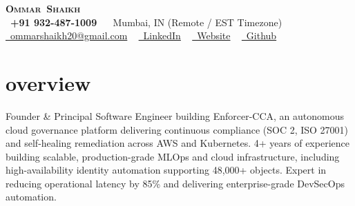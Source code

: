 \documentclass[11pt,letterpaper]{article}
\makeatletter
\newcommand{\firstname}{Ommar}
\newcommand{\lastname}{Shaikh}
\newcommand{\email}{ommarshaikh20@gmail.com}
\newcommand{\linkedin}{https://www.linkedin.com/in/ommar-shaikh-02b3a1207/}
\newcommand{\github}{https://github.com/OmmarShaikh01}
\newcommand{\website}{https://ommarshaikh01.github.io/}
\newcommand{\jasphone}{+91 932-487-1009}
\newcommand{\location}{Mumbai, IN (Remote / EST Timezone)}
\newcommand{\resumeoverview}{Founder \& Principal Software Engineer building Enforcer-CCA, an autonomous cloud governance platform delivering continuous compliance (SOC 2, ISO 27001) and self-healing remediation across AWS and Kubernetes. 4+ years of experience building scalable, production-grade MLOps and cloud infrastructure, including high-availability identity automation supporting 48,000+ objects. Expert in reducing operational latency by 85\% and delivering enterprise-grade DevSecOps automation.}
\makeatother
\begin{document}
    \AddToShipoutPicture*{%
        \color{grey}
        \AtPageUpperLeft{\rule[-3cm]{\paperwidth}{5cm}}
    }
    \begin{center}
        {\Huge \scshape \textbf{\firstname \ \lastname}} \\ \vspace{1pt}
        \vspace{2pt}
        \raisebox{-0.2\height}\textbullet \ \textbf{\jasphone} ~
        \raisebox{-0.2\height}\textbullet \ \location
        \vspace{2pt} \\
        \href{mailto:\email}{\raisebox{-0.2\height}\textbullet \ \email} ~
        \href{\linkedin}{\raisebox{-0.2\height}\textbullet \ LinkedIn} ~
        \href{\website}{\raisebox{-0.2\height}\textbullet \ Website} ~
        \href{\github}{\raisebox{-0.2\height}\textbullet \ Github} \\
        \vspace{8pt}
    \end{center}

    \section{overview}\label{sec:overview}
    \begin{center}
        \sloppy \justifying 
        \qquad \resumeoverview
        \vspace{-10pt}
    \end{center}
    
    
        
    
    

    
\end{document}
